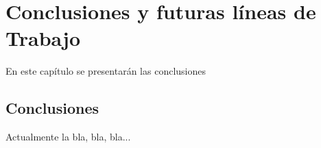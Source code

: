 %
 
\chapter{Conclusiones y futuras líneas de Trabajo} \label{chap:Conclusiones} 

En este capítulo se presentarán las conclusiones 

\section{Conclusiones}
 
Actualmente la bla, bla, bla...
